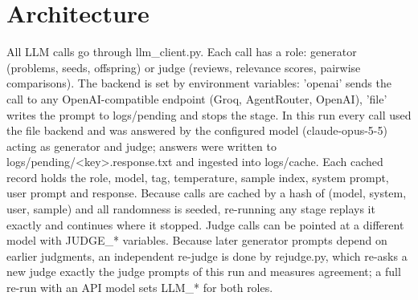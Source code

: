 \documentclass[11pt,a4paper]{article}
\begin{document}
\section{Architecture}
All LLM calls go through llm\_\allowbreak{}client.py. Each call has a role: generator (problems, seeds, offspring) or judge (reviews, relevance scores, pairwise comparisons). The backend is set by environment variables: 'openai' sends the call to any OpenAI-compatible endpoint (Groq, AgentRouter, OpenAI), 'file' writes the prompt to logs/pending and stops the stage. In this run every call used the file backend and was answered by the configured model (claude-opus-5-5) acting as generator and judge; answers were written to logs/pending/\textless{}key\textgreater{}.response.txt and ingested into logs/cache. Each cached record holds the role, model, tag, temperature, sample index, system prompt, user prompt and response. Because calls are cached by a hash of (model, system, user, sample) and all randomness is seeded, re-running any stage replays it exactly and continues where it stopped. Judge calls can be pointed at a different model with JUDGE\_\allowbreak{}* variables. Because later generator prompts depend on earlier judgments, an independent re-judge is done by rejudge.py, which re-asks a new judge exactly the judge prompts of this run and measures agreement; a full re-run with an API model sets LLM\_\allowbreak{}* for both roles.
\end{document}
